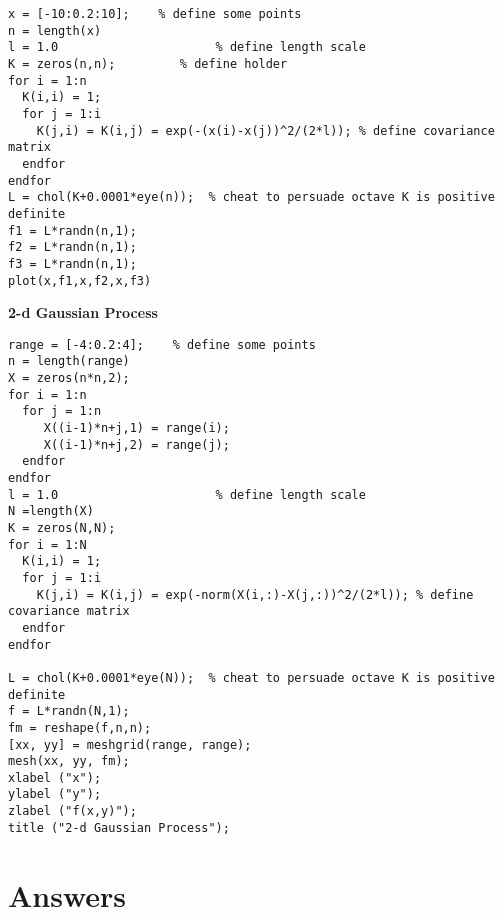 \documentclass[11pt]{article}
\begin{document}
\begin{verbatim}
x = [-10:0.2:10];    % define some points
n = length(x)
l = 1.0                      % define length scale
K = zeros(n,n);         % define holder
for i = 1:n
  K(i,i) = 1;
  for j = 1:i
    K(j,i) = K(i,j) = exp(-(x(i)-x(j))^2/(2*l)); % define covariance matrix
  endfor
endfor
L = chol(K+0.0001*eye(n));  % cheat to persuade octave K is positive definite
f1 = L*randn(n,1);
f2 = L*randn(n,1);
f3 = L*randn(n,1);
plot(x,f1,x,f2,x,f3)
\end{verbatim}

\textbf{2-d Gaussian Process}

\begin{verbatim}
range = [-4:0.2:4];    % define some points
n = length(range)
X = zeros(n*n,2);
for i = 1:n
  for j = 1:n
     X((i-1)*n+j,1) = range(i);
     X((i-1)*n+j,2) = range(j);
  endfor
endfor
l = 1.0                      % define length scale
N =length(X)
K = zeros(N,N);  
for i = 1:N
  K(i,i) = 1;
  for j = 1:i
    K(j,i) = K(i,j) = exp(-norm(X(i,:)-X(j,:))^2/(2*l)); % define covariance matrix
  endfor
endfor

L = chol(K+0.0001*eye(N));  % cheat to persuade octave K is positive definite
f = L*randn(N,1);
fm = reshape(f,n,n);
[xx, yy] = meshgrid(range, range);
mesh(xx, yy, fm);
xlabel ("x");
ylabel ("y");
zlabel ("f(x,y)");
title ("2-d Gaussian Process");
\end{verbatim}



\section{Answers}
\label{sec:orgb818bb4}
\end{document}
